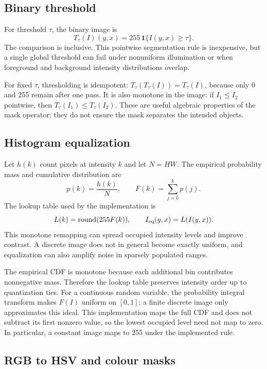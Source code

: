 \documentclass[11pt,a4paper]{article}
\newcommand{\1}{\mathbf{1}}
\begin{document}
\subsection{Binary threshold}

For threshold $\tau$, the binary image is
\[
  T_\tau(I)(y,x)=255\,\1\{I(y,x)\geq\tau\}.
\]
The comparison is inclusive. This pointwise segmentation rule is inexpensive,
but a single global threshold can fail under nonuniform illumination or when
foreground and background intensity distributions overlap.

For fixed $\tau$, thresholding is idempotent:
$T_\tau(T_\tau(I))=T_\tau(I)$, because only 0 and 255 remain after one pass.
It is also monotone in the image: if $I_1\le I_2$ pointwise, then
$T_\tau(I_1)\le T_\tau(I_2)$. These are useful algebraic properties of the
mask operator; they do not ensure the mask separates the intended objects.

\subsection{Histogram equalization}

Let $h(k)$ count pixels at intensity $k$ and let $N=HW$. The empirical
probability mass and cumulative distribution are
\[
  p(k)=\frac{h(k)}{N},\qquad F(k)=\sum_{j=0}^{k}p(j).
\]
The lookup table used by the implementation is
\[
  L(k)=\operatorname{round}(255F(k)),\qquad I_{\rm eq}(y,x)=L(I(y,x)).
\]
This monotone remapping can spread occupied intensity levels and improve
contrast. A discrete image does not in general become exactly uniform, and
equalization can also amplify noise in sparsely populated ranges.

The empirical CDF is monotone because each additional bin contributes
nonnegative mass. Therefore the lookup table preserves intensity order up to
quantization ties. For a continuous random variable, the probability integral
transform makes $F(I)$ uniform on $[0,1]$; a finite discrete image only
approximates this ideal. This implementation maps the full CDF and does not
subtract its first nonzero value, so the lowest occupied level need not map to
zero. In particular, a constant image maps to 255 under the implemented rule.

\subsection{RGB to HSV and colour masks}
\end{document}
